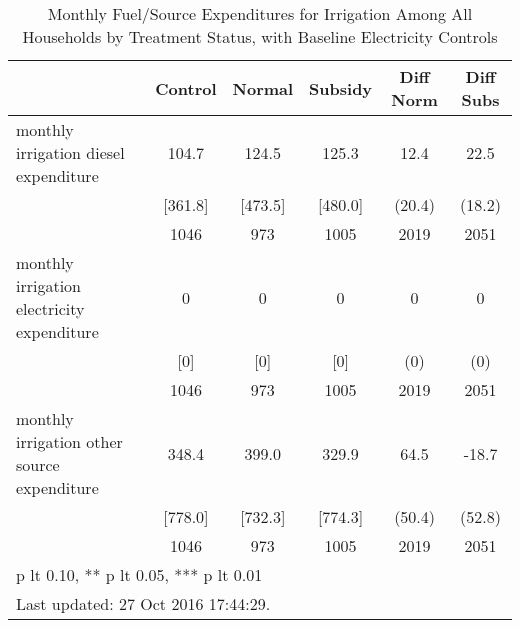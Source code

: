 \begin{table}[htbp]\centering
\def\sym#1{\ifmmode^{#1}\else\(^{#1}\)\fi}
\caption{Monthly Fuel/Source Expenditures for Irrigation Among All Households by Treatment Status, with Baseline Electricity Controls \label{tab:"balance"}}
\begin{tabular*}{0.9\hsize}{@{\hskip\tabcolsep\extracolsep\fill}l*{1}{ccccc}}
\toprule
                                &  Control&   Normal&  Subsidy&Diff Norm         &Diff Subs         \\
\midrule
monthly irrigation diesel expenditure&    104.7&    124.5&    125.3&     12.4         &     22.5         \\
                                &  [361.8]&  [473.5]&  [480.0]&   (20.4)         &   (18.2)         \\
                                &     1046&      973&     1005&     2019         &     2051         \\
monthly irrigation electricity expenditure&        0&        0&        0&        0         &        0         \\
                                &      [0]&      [0]&      [0]&      (0)         &      (0)         \\
                                &     1046&      973&     1005&     2019         &     2051         \\
monthly irrigation other source expenditure&    348.4&    399.0&    329.9&     64.5         &    -18.7         \\
                                &  [778.0]&  [732.3]&  [774.3]&   (50.4)         &   (52.8)         \\
                                &     1046&      973&     1005&     2019         &     2051         \\
\bottomrule
\multicolumn{6}{l}{\footnotesize * p lt 0.10, ** p lt 0.05, *** p lt 0.01}\\
\multicolumn{6}{l}{\footnotesize Last updated: 27 Oct 2016 17:44:29.}\\
\end{tabular*}
\end{table}
